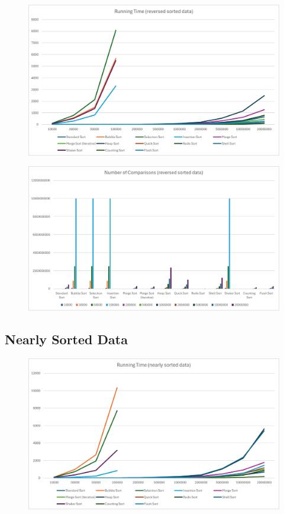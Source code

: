 \documentclass{article}
\begin{document}
\begin{figure}[ht]
	\centering
	\includegraphics[width=14cm]{images/time_reversed.png}
\end{figure}

\begin{figure}[ht]
	\centering
	\includegraphics[width=14cm]{images/comp_reversed.png}
\end{figure}


\pagebreak


\subsection{Nearly Sorted Data}

\begin{figure}[ht]
	\centering
	\includegraphics[width=14cm]{images/time_nearly.png}
\end{figure}
\end{document}
